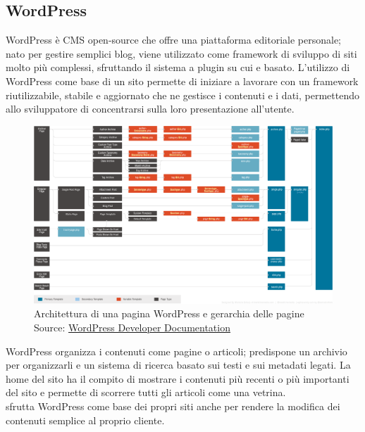    \subsection{WordPress}
   WordPress è \gls{CMS} open-source che offre una piattaforma editoriale personale; nato per gestire semplici blog, viene utilizzato come framework di sviluppo di siti molto più complessi, sfruttando il sistema a plugin su cui e basato. L'utilizzo di WordPress come base di un sito permette di iniziare a lavorare con un framework riutilizzabile, stabile e aggiornato che ne gestisce i contenuti e i dati, permettendo allo sviluppatore di concentrarsi sulla loro presentazione all'utente.
   \begin{figure}[H]
      \begin{center}
         \includegraphics[width=16.5cm,keepaspectratio]{immagini/template-hierarchy}
         \caption[Architettura di una pagina WordPress e gerarchia delle pagine]{Architettura di una pagina WordPress e gerarchia delle pagine
         \\
         Source: \href{https://developer.wordpress.org/themes/basics/template-hierarchy/}{WordPress Developer Documentation}}
      \end{center}
   \end{figure}
   WordPress organizza i contenuti come pagine o articoli; predispone un archivio per organizzarli e un sistema di ricerca basato sui testi e sui metadati legati. La home del sito ha il compito di mostrare i contenuti più recenti o più importanti del sito e permette di scorrere tutti gli articoli come una vetrina.
   \\
   \nomeAzienda{} sfrutta WordPress come base dei propri siti anche per rendere la modifica dei contenuti semplice al proprio cliente.

